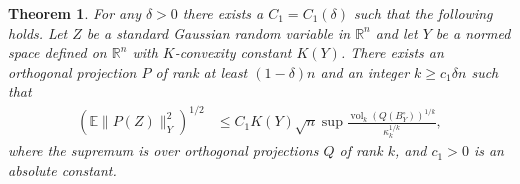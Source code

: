 \documentclass{article}
\newtheorem{theorem}{Theorem}
\newcommand{\R}{{\mathbb{R}}}
\newcommand{\E}{\mathbb{E}}
\DeclareMathOperator{\vol}{vol}
\begin{document}
\begin{theorem}\label{thm:volnum}
  For any $\delta > 0$ there exists a $C_1 = C_1(\delta)$ such that
  the following holds. Let $Z$ be a standard Gaussian random variable
  in $\R^n$ and let $Y$ be a normed space defined on $\R^n$ with
  $K$-convexity constant $K(Y)$. There exists an orthogonal projection
  $P$ of rank at least $(1-\delta)n$ and an integer $k \ge c_1\delta
  n$ such that
  \begin{align*}
  \left(\E \|P(Z)\|_Y^2\right)^{1/2} 
  &\le 
  C_1K(Y)\sqrt{n}
  \sup \frac{\vol_{k}(Q(B_Y^\circ))^{1/k}}{\kappa_k^{1/k}},
  \end{align*}
  where the supremum is over orthogonal projections $Q$ of rank $k$,
  and $c_1 >0$ is an absolute constant.
\end{theorem}
\end{document}
